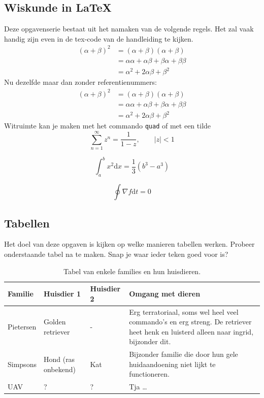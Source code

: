 \documentclass{article}
\begin{document}
\subsection{Wiskunde in \LaTeX}
Deze opgavenserie bestaat uit het namaken van de volgende regels. Het zal vaak handig zijn even in de tex-code van de handleiding te kijken. 
\begin{align}
(\alpha + \beta)^2 & = (\alpha + \beta)(\alpha + \beta)\\
					& = \alpha \alpha + \alpha \beta + \beta \alpha + \beta \beta\\
					& = \alpha^2 + 2 \alpha\beta + \beta^2
\end{align}
Nu dezelfde maar dan zonder referentienummers:
\begin{align*}
(\alpha + \beta)^2 & = (\alpha + \beta)(\alpha + \beta)\\
					& = \alpha \alpha + \alpha \beta + \beta \alpha + \beta \beta\\
					& = \alpha^2 + 2 \alpha\beta + \beta^2
\end{align*}
Witruimte kan je maken met het commando \texttt{quad} of met een tilde
\begin{equation}
\sum_{n=1}^{\infty}z^n = \frac{1}{1-z}, \qquad |z|<1
\end{equation}

\begin{equation}
\int_a^b\!x^2 \mathrm{d} x = \frac{1}{3}(b^3 - a^3)
\end{equation}


\begin{equation}
\oint \nabla f \mathrm{d} t = 0
\end{equation}



\subsection{Tabellen}
Het doel van deze opgaven is kijken op welke manieren tabellen werken. Probeer onderstaande tabel na te maken. Snap je waar ieder teken goed voor is?
\begin{table}[h]
	\begin{tabular}[width=\textwidth]{|l||llp{5cm}|}
		\hline
		\textbf{Familie} & \textbf{Huisdier 1} & \textbf{Huisdier 2} & \textbf{Omgang met dieren}\\
		\hline
		Pietersen & Golden retriever & - &  Erg terratoriaal, soms wel heel veel commando's en erg streng. De retriever heet henk en luisterd alleen naar ingrid, bijzonder dit. \\
		Simpsons & Hond (ras onbekend) & Kat & Bijzonder familie die door hun gele huidaandoening niet lijkt te functioneren. \\
		UAV & ? & ? & Tja \ldots \\		
		\hline
	\end{tabular}
\caption{Tabel van enkele families en hun huisdieren.}
\end{table}
\end{document}
